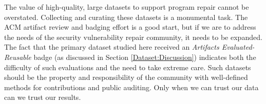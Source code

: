 The value of high-quality, large datasets to support program repair cannot be overstated.
Collecting and curating these datasets is a monumental task.
The ACM artifact review and badging effort is a good start, but if we are to address the needs of the security vulnerability repair community, it needs to be expanded.
The fact that the primary dataset studied here received an \emph{Artifacts Evaluated-Reusable} badge (as discussed in Section \ref{Dataset:Discussion}) indicates both the difficulty of such evaluations and the need to take extreme care.
Such datasets should be the property and responsibility of the community with well-defined methods for contributions and public auditing.
Only when we can trust our data can we trust our results.



